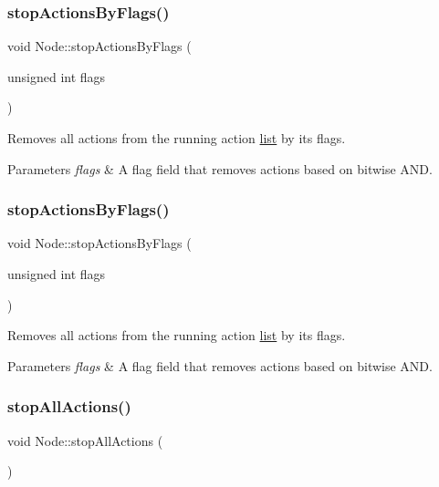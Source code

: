 \subsubsection{\texorpdfstring{stop\+Actions\+By\+Flags()}{stopActionsByFlags()}\hspace{0.1cm}{\footnotesize\ttfamily [1/2]}}
{\footnotesize\ttfamily void Node\+::stop\+Actions\+By\+Flags (\begin{DoxyParamCaption}\item[{unsigned int}]{flags }\end{DoxyParamCaption})}

Removes all actions from the running action \hyperlink{protocollist-p}{list} by its flags.


\begin{DoxyParams}{Parameters}
{\em flags} & A flag field that removes actions based on bitwise A\+ND. \\
\hline
\end{DoxyParams}
\mbox{\label{classNode_a36eef67f2b7d8026328d452e9a5ab09c}} 
\subsubsection{\texorpdfstring{stop\+Actions\+By\+Flags()}{stopActionsByFlags()}\hspace{0.1cm}{\footnotesize\ttfamily [2/2]}}
{\footnotesize\ttfamily void Node\+::stop\+Actions\+By\+Flags (\begin{DoxyParamCaption}\item[{unsigned int}]{flags }\end{DoxyParamCaption})}

Removes all actions from the running action \hyperlink{protocollist-p}{list} by its flags.


\begin{DoxyParams}{Parameters}
{\em flags} & A flag field that removes actions based on bitwise A\+ND. \\
\hline
\end{DoxyParams}
\mbox{\label{classNode_a1d542784d864cffe325e9e32d180aa6d}} 
\subsubsection{\texorpdfstring{stop\+All\+Actions()}{stopAllActions()}\hspace{0.1cm}{\footnotesize\ttfamily [1/2]}}
{\footnotesize\ttfamily void Node\+::stop\+All\+Actions (\begin{DoxyParamCaption}{ }\end{DoxyParamCaption})}

